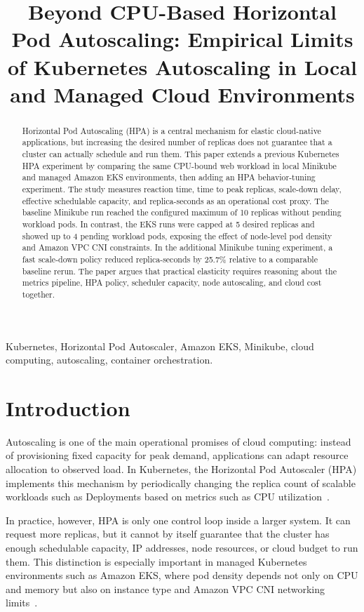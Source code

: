 \documentclass[conference]{IEEEtran}
\title{Beyond CPU-Based Horizontal Pod Autoscaling: Empirical Limits of Kubernetes Autoscaling in Local and Managed Cloud Environments}
\author{\IEEEauthorblockN{Ivo Motoki Makiyama Lopes}
\IEEEauthorblockA{Escola Politecnica, Universidade de Sao Paulo\\
PSI5120 -- Topicos de Computacao em Nuvem\\
ivo.motoki@usp.br\\
\url{https://github.com/IvoMotoki/psi5120-trabalho-hpa-final}}}
\begin{document}
\maketitle

\begin{abstract}
Horizontal Pod Autoscaling (HPA) is a central mechanism for elastic cloud-native applications, but increasing the desired number of replicas does not guarantee that a cluster can actually schedule and run them. This paper extends a previous Kubernetes HPA experiment by comparing the same CPU-bound web workload in local Minikube and managed Amazon EKS environments, then adding an HPA behavior-tuning experiment. The study measures reaction time, time to peak replicas, scale-down delay, effective schedulable capacity, and replica-seconds as an operational cost proxy. The baseline Minikube run reached the configured maximum of 10 replicas without pending workload pods. In contrast, the EKS runs were capped at 5 desired replicas and showed up to 4 pending workload pods, exposing the effect of node-level pod density and Amazon VPC CNI constraints. In the additional Minikube tuning experiment, a fast scale-down policy reduced replica-seconds by 25.7\% relative to a comparable baseline rerun. The paper argues that practical elasticity requires reasoning about the metrics pipeline, HPA policy, scheduler capacity, node autoscaling, and cloud cost together.
\end{abstract}

\begin{IEEEkeywords}
Kubernetes, Horizontal Pod Autoscaler, Amazon EKS, Minikube, cloud computing, autoscaling, container orchestration.
\end{IEEEkeywords}

\section{Introduction}

Autoscaling is one of the main operational promises of cloud computing: instead of provisioning fixed capacity for peak demand, applications can adapt resource allocation to observed load. In Kubernetes, the Horizontal Pod Autoscaler (HPA) implements this mechanism by periodically changing the replica count of scalable workloads such as Deployments based on metrics such as CPU utilization~\cite{kubernetes_hpa_concepts}.

In practice, however, HPA is only one control loop inside a larger system. It can request more replicas, but it cannot by itself guarantee that the cluster has enough schedulable capacity, IP addresses, node resources, or cloud budget to run them. This distinction is especially important in managed Kubernetes environments such as Amazon EKS, where pod density depends not only on CPU and memory but also on instance type and Amazon VPC CNI networking limits~\cite{aws_eks_vpc_cni}.
\end{document}
